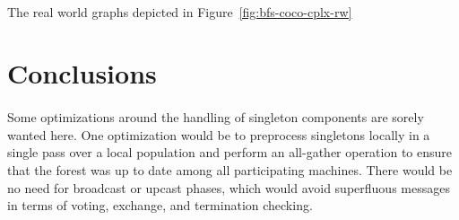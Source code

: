 \documentclass[11pt,epsf]{article}
\begin{document}
{{    \paragraph{}{
      The real world graphs depicted in Figure~\ref{fig:bfs-coco-cplx-rw} 
    }
  }  
}

\section{Conclusions}{
  \paragraph{}{
    Some optimizations around the handling of singleton components are sorely wanted here.
    One optimization would be to preprocess singletons locally in a single pass over a local
    population and perform an all-gather operation to ensure that the forest was up to date
    among all participating machines. There would be no need for broadcast or upcast phases,
    which would avoid superfluous messages in terms of voting, exchange, and termination checking.
  }
}

\printbibliography
\end{document}

